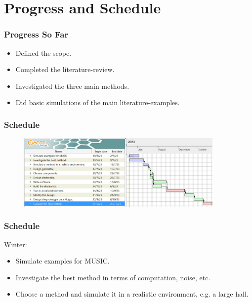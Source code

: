 \documentclass{beamer}
\begin{document}
\section{Progress and Schedule}

\begin{frame}
\frametitle{Progress So Far}

\begin{itemize}
	\item Defined the scope.
	\item Completed the literature-review.
	\item Investigated the three main methods.
	\item Did basic simulations of the main literature-examples.
\end{itemize}

\end{frame}

\begin{frame}
\frametitle{Schedule}

\begin{figure}[H]
\includegraphics[width=0.9\textwidth]{./gant.png}
\centering
\end{figure}

\end{frame}

\begin{frame}
\frametitle{Schedule}

Winter:
\begin{itemize}
	\item Simulate examples for MUSIC.
	\item Investigate the best method in terms of computation, noise, etc.
	\item Choose a method and simulate it in a realistic environment, e.g. a large hall.
\end{itemize}

\end{frame}
\end{document}
